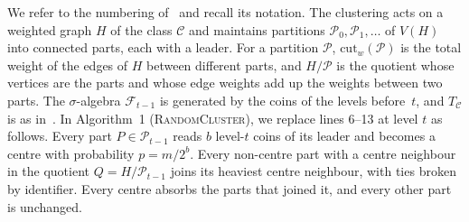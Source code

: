 \documentclass[11pt]{article}
\theoremstyle{remark}
\newcommand{\cut}{\mathrm{cut}}
\begin{document}
We refer to the numbering of~\cite{AS26} and recall its notation. The clustering acts on a weighted
graph $H$ of the class $\mathcal C$ and maintains partitions $\mathcal P_0,\mathcal P_1,\dots$ of $V(H)$
into connected parts, each with a leader. For a partition $\mathcal P$, $\cut_w(\mathcal P)$ is the
total weight of the edges of $H$ between different parts, and $H/\mathcal P$ is the quotient whose
vertices are the parts and whose edge weights add up the weights between two parts. The
$\sigma$-algebra $\mathcal F_{t-1}$ is generated by the coins of the levels before~$t$, and
$T_{\mathcal C}$ is as in~\cite[Thm.~5.4]{AS26}. In Algorithm~1 (\textsc{RandomCluster}), we replace lines 6--13 at
level $t$ as follows. Every part $P\in\mathcal{P}_{t-1}$ reads $b$ level-$t$ coins of its leader and
becomes a centre with probability $p=m/2^b$. Every non-centre part with a centre neighbour in
the quotient $Q=H/\mathcal{P}_{t-1}$ joins its heaviest centre neighbour, with ties broken by
identifier. Every centre absorbs the parts that joined it, and every other part is unchanged.
\end{document}
